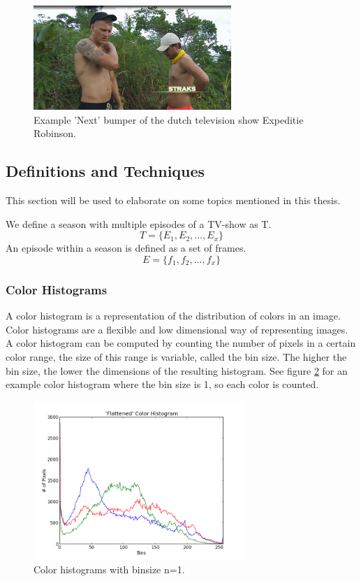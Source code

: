 \documentclass{article}
\begin{document}
\begin{figure}[H]
    \includegraphics[width=7.5cm]{images/straks.png}
    \centering
    \caption{Example 'Next' bumper of the dutch television show Expeditie Robinson.}
    \label{examplebumper}
\end{figure}

\subsection{Definitions and Techniques}
This section will be used to elaborate on some topics mentioned in this thesis.

We define a season with multiple episodes of a TV-show as T.
\[T = \{E_1, E_2, \dots, E_x\}\]
An episode within a season is defined as a set of frames.
\[E = \{f_1, f_2, \dots, f_x\}\]


\subsubsection{Color Histograms}
A color histogram is a representation of the distribution of colors in an image. Color histograms are a flexible and low dimensional way of representing images. A color histogram can be computed by counting the number of pixels in a certain color range, the size of this range is variable, called the bin size. The higher the bin size, the lower the dimensions of the resulting histogram. See figure \ref{fig:colorhistogram} for an example color histogram where the bin size is 1, so each color is counted. 

\begin{figure}[H]
	\includegraphics[width=8cm]{images/colorhistogram.png}
	\centering
	\caption{Color histograms with binsize n=1.}
	\label{fig:colorhistogram}
\end{figure}
\end{document}
